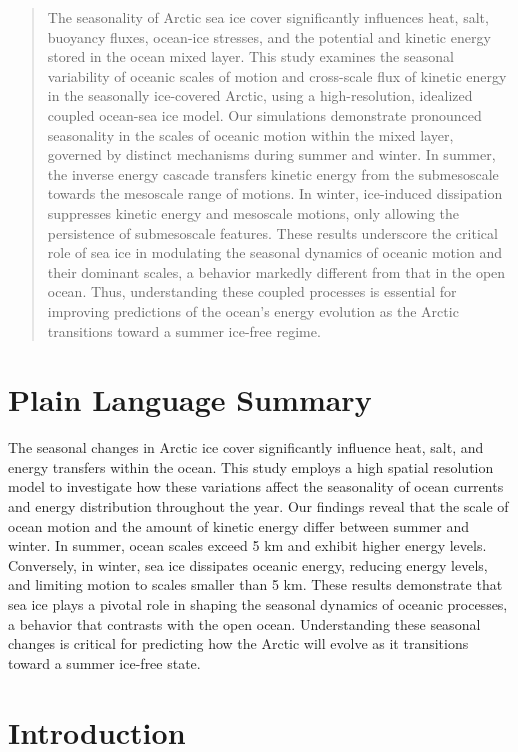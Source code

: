 \documentclass[draft]{agujournal2019}
\begin{document}
\begin{abstract}
  The seasonality of Arctic sea ice cover significantly influences heat, salt, buoyancy fluxes, ocean-ice stresses, and the potential and kinetic energy stored in the ocean mixed layer. This study examines the seasonal variability of oceanic scales of motion and cross-scale flux of kinetic energy in the seasonally ice-covered Arctic, using a high-resolution, idealized coupled ocean-sea ice model. Our simulations demonstrate pronounced seasonality in the scales of oceanic motion within the mixed layer, governed by distinct mechanisms during summer and winter. In summer, the inverse energy cascade transfers kinetic energy from the submesoscale towards the mesoscale range of motions. In winter, ice-induced dissipation suppresses kinetic energy and mesoscale motions, only allowing the persistence of submesoscale features. These results underscore the critical role of sea ice in modulating the seasonal dynamics of oceanic motion and their dominant scales, a behavior markedly different from that in the open ocean. Thus, understanding these coupled processes is essential for improving predictions of the ocean's energy evolution as the Arctic transitions toward a summer ice-free regime.
\end{abstract}

\section*{Plain Language Summary}

The seasonal changes in Arctic ice cover significantly influence heat, salt, and energy transfers within the ocean. This study employs a high spatial resolution model to investigate how these variations affect the seasonality of ocean currents and energy distribution throughout the year. Our findings reveal that the scale of ocean motion and the amount of kinetic energy differ between summer and winter. In summer, ocean scales exceed 5 km and exhibit higher energy levels. Conversely, in winter, sea ice dissipates oceanic energy, reducing energy levels, and limiting motion to scales smaller than 5 km. These results demonstrate that sea ice plays a pivotal role in shaping the seasonal dynamics of oceanic processes, a behavior that contrasts with the open ocean. Understanding these seasonal changes is critical for predicting how the Arctic will evolve as it transitions toward a summer ice-free state.


\section{Introduction}
\end{document}
